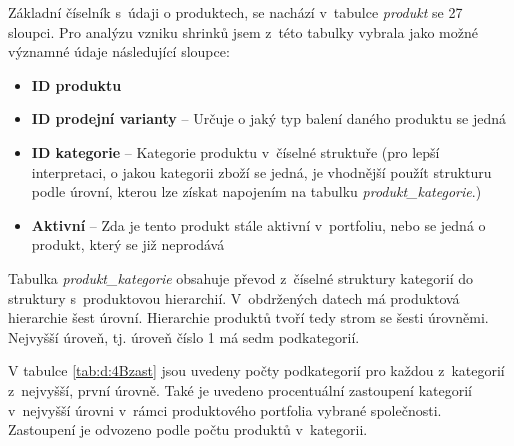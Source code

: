 Základní číselník s~údaji o produktech, se nachází v~tabulce \emph{produkt} se 27 sloupci. Pro analýzu vzniku shrinků jsem z~této tabulky vybrala jako možné významné údaje následující sloupce:

\begin{itemize}
    \itemsep0em 
    \item \textbf{ID produktu}
    \item \textbf{ID prodejní varianty} -- Určuje o jaký typ balení daného produktu se jedná    
    \item \textbf{ID kategorie} -- Kategorie produktu v~číselné struktuře (pro lepší interpretaci, o jakou kategorii zboží se jedná, je vhodnější použít strukturu podle úrovní, kterou lze získat napojením na tabulku \emph{produkt\_kategorie}.)
    \item \textbf{Aktivní} --  Zda je tento produkt stále aktivní v~portfoliu, nebo se jedná o produkt, který se již neprodává
\end{itemize}

Tabulka \emph{produkt\_kategorie} obsahuje převod z~číselné struktury kategorií do struktury s~produktovou hierarchií. V~obdržených datech má produktová hierarchie šest úrovní. Hierarchie produktů tvoří tedy strom se šesti úrovněmi. Nejvyšší úroveň, tj. úroveň číslo 1 má sedm podkategorií.

V tabulce \ref*{tab:d:4Bzast} jsou uvedeny počty podkategorií pro každou z~kategorií z~nejvyšší, první úrovně. Také je uvedeno procentuální zastoupení kategorií v~nejvyšší úrovni v~rámci produktového portfolia vybrané společnosti. Zastoupení je odvozeno podle počtu produktů v~kategorii.

